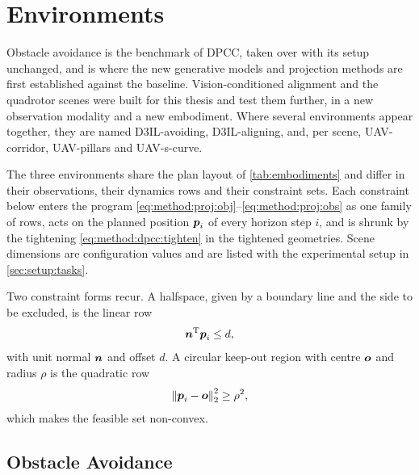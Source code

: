 \section{Environments}\label{sec:method:envs}

Obstacle avoidance is the
benchmark of \ac{DPCC}, taken over with its setup unchanged, and is where the new generative models
and projection methods are first established against the baseline. Vision-conditioned alignment and the
quadrotor scenes were built for this thesis and test them further, in a new observation modality and a
new embodiment. Where several environments appear together, they are named D3IL-avoiding,
D3IL-aligning, and, per scene, UAV-corridor, UAV-pillars and UAV-s-curve.

The three environments share the plan layout of \autoref{tab:embodiments} and differ in their
observations, their dynamics rows and their constraint sets. Each constraint below enters the program
\eqref{eq:method:proj:obj}--\eqref{eq:method:proj:obs} as one family of rows, acts on the planned
position $\boldsymbol{p}_{i}$ of every horizon step $i$, and is shrunk by the tightening
\eqref{eq:method:dpcc:tighten} in the tightened geometries. Scene dimensions are configuration values and
are listed with the experimental setup in \autoref{sec:setup:tasks}.

Two constraint forms recur. A halfspace, given by a boundary line and the side to be excluded, is the
linear row
\begin{equation}\label{eq:method:env:halfspace}
  \boldsymbol{n}^{\textrm{T}}\boldsymbol{p}_{i} \le d ,
\end{equation}
with unit normal $\boldsymbol{n}$ and offset $d$. A circular keep-out region with centre $\boldsymbol{o}$ and radius
$\rho$ is the quadratic row
\begin{equation}\label{eq:method:env:disk}
  \left\|\boldsymbol{p}_{i}-\boldsymbol{o}\right\|_{2}^{2} \ge \rho^{2},
\end{equation}
which makes the feasible set non-convex.

\subsection{Obstacle Avoidance}\label{sec:method:env:avoiding}

